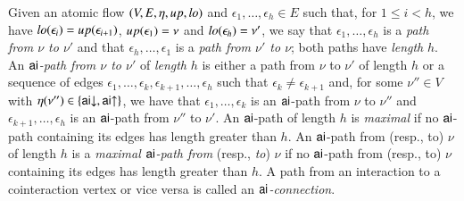 \begin{definition}
Given an atomic flow $(V,E,\eta,{\mathit up},{\mathit lo})$ and $\epsilon_1,\dots,\epsilon_h\in E$ such that, for $1\le i<h$, we have ${\mathit lo}(\epsilon_i)={\mathit up}(\epsilon_{i+1})$, ${\mathit up}(\epsilon_1)=\nu$ and ${\mathit lo}(\epsilon_h)=\nu'$, we say that $\epsilon_1,\dots,\epsilon_h$ is a \emph{path from $\nu$ to $\nu'$} and that $\epsilon_h,\dots,\epsilon_1$ is a \emph{path from $\nu'$ to $\nu$}; both paths have \emph{length} $h$. An \emph{$\mathsf{ai}$-path from $\nu$ to $\nu'$} of \emph{length} $h$ is either a path from $\nu$ to $\nu'$ of length $h$ or a sequence of edges $\epsilon_1,\dots,\epsilon_k,\epsilon_{k+1},\dots,\epsilon_h$ such that $\epsilon_k \ne \epsilon_{k+1}$ and, for some $\nu''\in V$ with $\eta(\nu'')\in\{\mathsf{ai}{\downarrow},\mathsf{ai}{\uparrow}\}$, we have that $\epsilon_1,\dots,\epsilon_k$ is an $\mathsf{ai}$-path from $\nu$ to $\nu''$ and $\epsilon_{k+1},\dots,\epsilon_h$ is an $\mathsf{ai}$-path from $\nu''$ to $\nu'$. An $\mathsf{ai}$-path of length $h$ is \emph{maximal} if no $\mathsf{ai}$-path containing its edges has length greater than $h$. An $\mathsf{ai}$-path from (resp., to) $\nu$ of length $h$ is a \emph{maximal\/ $\mathsf{ai}$-path from} (resp., \emph{to}) $\nu$ if no $\mathsf{ai}$-path from (resp., to) $\nu$ containing its edges has length greater than $h$. A path from an interaction to a cointeraction vertex or vice versa is called an \emph{$\mathsf{ai}$-connection}.
\end{definition}

